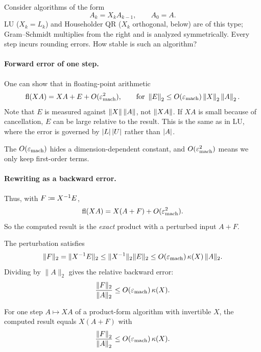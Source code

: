 Consider algorithms of the form
\begin{equation}
  A_k = X_kA_{k-1}, \qquad A_0 = A.
\end{equation}
LU ($X_k = L_k$) and Householder QR ($X_k$ orthogonal, below) are of this type; Gram--Schmidt multiplies from the right and is analyzed symmetrically. Every step incurs rounding errors. How stable is such an algorithm?

\paragraph{Forward error of one step.} One can show that in floating-point arithmetic
\begin{equation}
  \operatorname{fl}(XA) = XA + E + O(\varepsilon_{\mathrm{mach}}^2), \qquad \text{for } \left\lVert E \right\rVert_2 \le O(\varepsilon_{\mathrm{mach}})\left\lVert X \right\rVert_2\left\lVert A \right\rVert_2.
\end{equation}
Note that $E$ is measured against $\left\lVert X \right\rVert\left\lVert A \right\rVert$, not $\left\lVert XA \right\rVert$. If $XA$ is small because of cancellation, $E$ can be large relative to the result. This is the same as in LU, where the error is governed by $\left\lvert L \right\rvert\left\lvert U \right\rvert$ rather than $\left\lvert A \right\rvert$.

The $O(\varepsilon_{\mathrm{mach}})$ hides a dimension-dependent constant, and $O(\varepsilon_{\mathrm{mach}}^2)$ means we only keep first-order terms.

\paragraph{Rewriting as a backward error.} Thus, with $F \coloneqq X^{-1}E$,
\begin{equation}
  \operatorname{fl}(XA) = X(A + F) + O(\varepsilon_{\mathrm{mach}}^2).
\end{equation}
So the computed result is the \emph{exact} product with a perturbed input $A + F$.

The perturbation satisfies
\begin{equation}
  \lVert F \rVert_2 = \lVert X^{-1}E \rVert_2 \le \lVert X^{-1} \rVert_2 \lVert E \rVert_2 \le O(\varepsilon_{\mathrm{mach}})\,\kappa(X)\,\lVert A \rVert_2.
\end{equation}
Dividing by $\lVert A \rVert_2$ gives the relative backward error:
\begin{equation*}
  \frac{\lVert F \rVert_2}{\lVert A \rVert_2} \le O(\varepsilon_{\mathrm{mach}})\,\kappa(X).
\end{equation*}

\begin{theorem}
  \label{thm:product-error}
  For one step $A \mapsto XA$ of a product-form algorithm with invertible $X$, the computed result equals $X(A + F)$ with
  \begin{equation}
    \frac{\left\lVert F \right\rVert_2}{\left\lVert A \right\rVert_2} \le O(\varepsilon_{\mathrm{mach}})\,\kappa(X).
  \end{equation}
\end{theorem}

